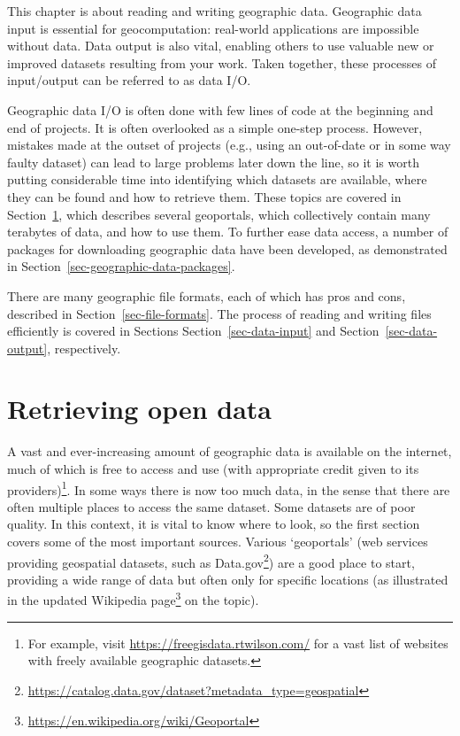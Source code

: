 \documentclass[
  letterpaper,
]{krantz}
\begin{document}
This chapter is about reading and writing geographic data. Geographic
data input is essential for geocomputation: real-world applications are
impossible without data. Data output is also vital, enabling others to
use valuable new or improved datasets resulting from your work. Taken
together, these processes of input/output can be referred to as data
I/O.

Geographic data I/O is often done with few lines of code at the
beginning and end of projects. It is often overlooked as a simple
one-step process. However, mistakes made at the outset of projects
(e.g., using an out-of-date or in some way faulty dataset) can lead to
large problems later down the line, so it is worth putting considerable
time into identifying which datasets are available, where they can be
found and how to retrieve them. These topics are covered in
Section~\ref{sec-retrieving-open-data}, which describes several
geoportals, which collectively contain many terabytes of data, and how
to use them. To further ease data access, a number of packages for
downloading geographic data have been developed, as demonstrated in
Section~\ref{sec-geographic-data-packages}.

There are many geographic file formats, each of which has pros and cons,
described in Section~\ref{sec-file-formats}. The process of reading and
writing files efficiently is covered in Sections
Section~\ref{sec-data-input} and Section~\ref{sec-data-output},
respectively.

\section{Retrieving open data}\label{sec-retrieving-open-data}

A vast and ever-increasing amount of geographic data is available on the
internet, much of which is free to access and use (with appropriate
credit given to its providers)\footnote{For example, visit
  \url{https://freegisdata.rtwilson.com/} for a vast list of websites
  with freely available geographic datasets.}. In some ways there is now
too much data, in the sense that there are often multiple places to
access the same dataset. Some datasets are of poor quality. In this
context, it is vital to know where to look, so the first section covers
some of the most important sources. Various `geoportals' (web services
providing geospatial datasets, such as Data.gov\footnote{\url{https://catalog.data.gov/dataset?metadata_type=geospatial}})
are a good place to start, providing a wide range of data but often only
for specific locations (as illustrated in the updated Wikipedia
page\footnote{\url{https://en.wikipedia.org/wiki/Geoportal}} on the
topic).
\end{document}

